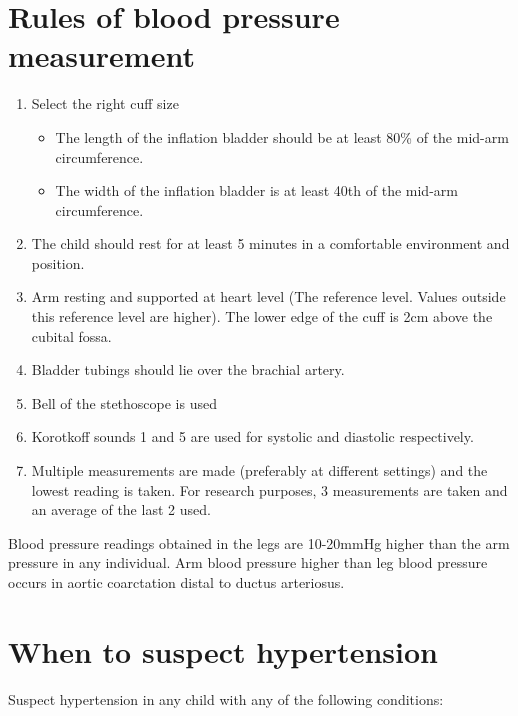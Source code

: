 \documentclass[
  letterpaper,
  DIV=11,
  numbers=noendperiod]{scrreprt}
\providecommand{\tightlist}{%
  \setlength{\itemsep}{0pt}\setlength{\parskip}{0pt}}\usepackage{longtable,booktabs,array}
\begin{document}
\hypertarget{rules-of-blood-pressure-measurement}{%
\section{Rules of blood pressure
measurement}\label{rules-of-blood-pressure-measurement}}

\begin{enumerate}
\def\labelenumi{\arabic{enumi}.}
\tightlist
\item
  Select the right cuff size

  \begin{itemize}
  \tightlist
  \item
    The length of the inflation bladder should be at least 80\% of the
    mid-arm circumference.
  \item
    The width of the inflation bladder is at least 40th of the mid-arm
    circumference.
  \end{itemize}
\item
  The child should rest for at least 5 minutes in a comfortable
  environment and position.
\item
  Arm resting and supported at heart level (The reference level. Values
  outside this reference level are higher). The lower edge of the cuff
  is 2cm above the cubital fossa.
\item
  Bladder tubings should lie over the brachial artery.
\item
  Bell of the stethoscope is used
\item
  Korotkoff sounds 1 and 5 are used for systolic and diastolic
  respectively.
\item
  Multiple measurements are made (preferably at different settings) and
  the lowest reading is taken. For research purposes, 3 measurements are
  taken and an average of the last 2 used.
\end{enumerate}

Blood pressure readings obtained in the legs are 10-20mmHg higher than
the arm pressure in any individual. Arm blood pressure higher than leg
blood pressure occurs in aortic coarctation distal to ductus arteriosus.

\hypertarget{when-to-suspect-hypertension}{%
\section{When to suspect
hypertension}\label{when-to-suspect-hypertension}}

Suspect hypertension in any child with any of the following conditions:
\end{document}
